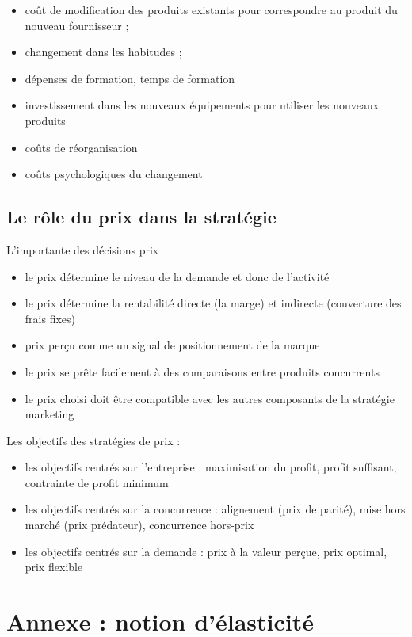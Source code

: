 		\begin{itemize}
			\item coût de modification des produits existants pour correspondre au produit du nouveau fournisseur ;
			\item changement dans les habitudes ;
			\item dépenses de formation, temps de formation
			\item investissement dans les nouveaux équipements pour utiliser les nouveaux produits
			\item coûts de réorganisation
			\item coûts psychologiques du changement
		\end{itemize}
		
		\subsection{Le rôle du prix dans la stratégie}
		
		L'importante des décisions prix
		
		\begin{itemize}
			\item le prix détermine le niveau de la demande et donc de l'activité
			\item le prix détermine la rentabilité directe (la marge) et indirecte (couverture des frais fixes)
			\item prix perçu comme un signal de positionnement de la marque
			\item le prix se prête facilement à des comparaisons entre produits concurrents
			\item le prix choisi doit être compatible avec les autres composants de la stratégie marketing
		\end{itemize}
		\n
		Les objectifs des stratégies de prix :
		
		\begin{itemize}
			\item les objectifs centrés sur l'entreprise : maximisation du profit, profit suffisant, contrainte de profit minimum
			\item les objectifs centrés sur la concurrence : alignement (prix de parité), mise hors marché (prix prédateur), concurrence hors-prix
			\item les objectifs centrés sur la demande : prix à la valeur perçue, prix optimal, prix flexible
		\end{itemize}
		
		
	\section{Annexe : notion d'élasticité}
		
